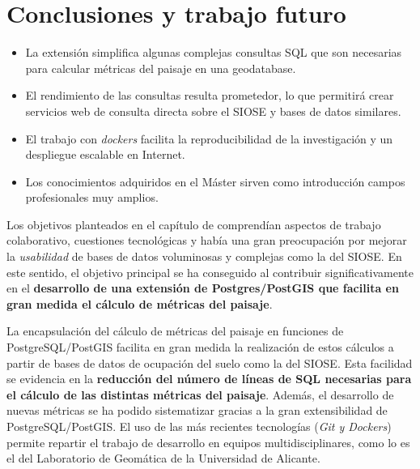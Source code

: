 \chapter{Conclusiones y trabajo futuro}\label{chap:concl}

\begin{graybox}
\begin{itemize}
\item La extensión \pgland{} simplifica algunas complejas consultas SQL que son necesarias para calcular métricas del paisaje en una geodatabase.
\item El rendimiento de las consultas resulta prometedor, lo que permitirá crear servicios web de consulta directa sobre el SIOSE y bases de datos similares.   
\item El trabajo con \textit{dockers} facilita la reproducibilidad de la investigación y un despliegue escalable en Internet.
\item Los conocimientos adquiridos en el Máster sirven como introducción campos profesionales muy amplios.
\end{itemize}
\end{graybox}

Los objetivos planteados en el capítulo de  comprendían aspectos de trabajo colaborativo, cuestiones tecnológicas y había una gran preocupación por mejorar la \textit{usabilidad} de bases de datos voluminosas y complejas como la del SIOSE. En este sentido, el objetivo principal se ha conseguido al contribuir significativamente en el \textbf{desarrollo de una extensión de Postgres/PostGIS que facilita en gran medida el cálculo de métricas del paisaje}. 

La encapsulación del cálculo de métricas del paisaje en funciones de PostgreSQL/PostGIS facilita en gran medida la realización de estos cálculos a partir de bases de datos de ocupación del suelo como la del SIOSE. Esta facilidad se evidencia en la \textbf{reducción del número de líneas de SQL necesarias para el cálculo de las distintas métricas del paisaje}. Además, el desarrollo de nuevas métricas se ha podido sistematizar gracias a la gran extensibilidad de PostgreSQL/PostGIS. El uso de las más recientes tecnologías (\textit{Git y Dockers}) permite repartir el trabajo de desarrollo en equipos multidisciplinares, como lo es el del Laboratorio de Geomática de la Universidad de Alicante.

